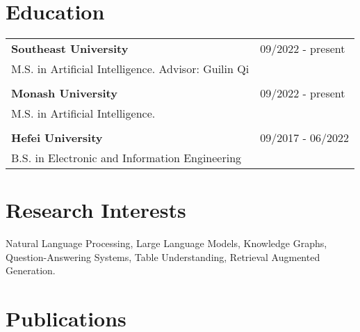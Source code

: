 \documentclass[a4paper,12pt]{article}
\begin{document}
\section{Education}
\begin{tabularx}{\linewidth}{@{}l X@{}}	

\textbf{Southeast University } & \hfill 09/2022 - present \\
M.S. in Artificial Intelligence. Advisor: Guilin Qi \\
\\
\textbf{Monash University } & \hfill 09/2022 - present \\
M.S. in Artificial Intelligence. \\
\\
\textbf{Hefei University} & \hfill 09/2017 - 06/2022 \\
B.S. in Electronic and Information Engineering\\




\end{tabularx}

\section{Research Interests}
Natural Language Processing, Large Language Models, Knowledge Graphs, Question-Answering Systems, Table Understanding, Retrieval Augmented Generation.

\section{Publications}
\end{document}
